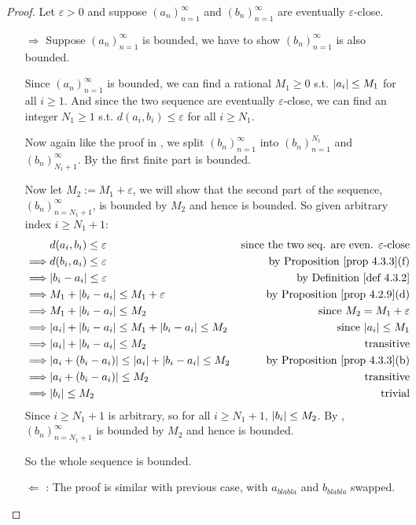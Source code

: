 \begin{proof}
Let \(\varepsilon > 0\) and suppose \((a_n)_{n = 1}^{\infty}\) and \((b_n)_{n = 1}^{\infty}\) are eventually \(\varepsilon\)-close.
\begin{itemize}
    \item[\(\Longrightarrow\)]
        Suppose \((a_n)_{n = 1}^{\infty}\) is bounded, we have to show \((b_n)_{n = 1}^{\infty}\) is also bounded.

        Since \((a_n)_{n = 1}^{\infty}\) is bounded, we can find a rational \(M_1 \ge 0\) s.t. \(\lvert a_i\rvert \le M_1\) for all \(i \ge 1\). And since the two sequence are eventually \(\varepsilon\)-close, we can find an integer \(N_1 \ge 1\) s.t. \(d(a_i, b_i) \le \varepsilon\) for all \(i \ge N_1\).
        
        Now again like the proof in , we split \((b_n)_{n = 1}^{\infty}\) into \((b_n)_{n = 1}^{N_1}\) and \((b_n)_{N_1 + 1}^{\infty}\).
        By  the first finite part is bounded.
        
        Now let \(M_2 := M_1 + \varepsilon\), we will show that the second part of the sequence, \((b_n)_{n = N_1 + 1}^{\infty}\), is bounded by \(M_2\) and hence is bounded.
        So given arbitrary index \(i \ge N_1 + 1\):
        \begin{align*}
                     & d(a_i, b_i) \le \varepsilon & \text{since the two seq. are even. \(\varepsilon\)-close} \\
            \implies & d(b_i, a_i) \le \varepsilon & \text{by \PROP{4.3.3}(f)} \\
            \implies & \abs{b_i - a_i} \le \varepsilon & \text{by \DEF{4.3.2}} \\
            \implies & M_1 + \abs{b_i - a_i} \le M_1 + \varepsilon & \text{by \PROP{4.2.9}(d)} \\
            \implies & M_1 + \abs{b_i - a_i} \le M_2 & \text{since \(M_2 = M_1 + \varepsilon\)}\\
            \implies & \abs{a_i} + \abs{b_i - a_i} \le M_1 + \abs{b_i - a_i} \le M_2 & \text{since \(\abs{a_i} \le M_1\)} \\
            \implies & \abs{a_i} + \abs{b_i - a_i} \le M_2 & \text{transitive} \\
            \implies & \abs{a_i + (b_i - a_i)} \le \abs{a_i} + \abs{b_i - a_i} \le M_2 & \text{by \PROP{4.3.3}(b)} \\
            \implies & \abs{a_i + (b_i - a_i)} \le M_2 & \text{transitive}  \\
            \implies & \abs{b_i} \le M_2 & \text{trivial} \\
        \end{align*}
        Since \(i \ge N_1 + 1\) is arbitrary, so for all \(i \ge N_1 + 1\), \(\lvert b_i\rvert \le M_2\).
        By , \((b_n)_{n = N_1 + 1}^{\infty}\) is bounded by \(M_2\) and hence is bounded.

        So the whole sequence is bounded.
    \item[\(\Longleftarrow\)]:
        The proof is similar with previous case, with \(a_{blabla}\) and \(b_{blabla}\) swapped.
\end{itemize}
\end{proof}